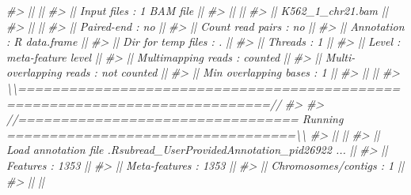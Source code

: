 \documentclass[
]{article}
\newenvironment{Shaded}{\begin{snugshade}}{\end{snugshade}}
\newcommand{\CommentTok}[1]{\textcolor[rgb]{0.56,0.35,0.01}{\textit{#1}}}
\begin{document}
\begin{Shaded}
\begin{Highlighting}[]
\CommentTok{\#\textgreater{} ||                                                                            ||}
\CommentTok{\#\textgreater{} ||             Input files : 1 BAM file                                       ||}
\CommentTok{\#\textgreater{} ||                                                                            ||}
\CommentTok{\#\textgreater{} ||                           K562\_1\_chr21.bam                                 ||}
\CommentTok{\#\textgreater{} ||                                                                            ||}
\CommentTok{\#\textgreater{} ||              Paired{-}end : no                                               ||}
\CommentTok{\#\textgreater{} ||        Count read pairs : no                                               ||}
\CommentTok{\#\textgreater{} ||              Annotation : R data.frame                                     ||}
\CommentTok{\#\textgreater{} ||      Dir for temp files : .                                                ||}
\CommentTok{\#\textgreater{} ||                 Threads : 1                                                ||}
\CommentTok{\#\textgreater{} ||                   Level : meta{-}feature level                               ||}
\CommentTok{\#\textgreater{} ||      Multimapping reads : counted                                          ||}
\CommentTok{\#\textgreater{} || Multi{-}overlapping reads : not counted                                      ||}
\CommentTok{\#\textgreater{} ||   Min overlapping bases : 1                                                ||}
\CommentTok{\#\textgreater{} ||                                                                            ||}
\CommentTok{\#\textgreater{} \textbackslash{}\textbackslash{}============================================================================//}
\CommentTok{\#\textgreater{} }
\CommentTok{\#\textgreater{} //================================= Running ==================================\textbackslash{}\textbackslash{}}
\CommentTok{\#\textgreater{} ||                                                                            ||}
\CommentTok{\#\textgreater{} || Load annotation file .Rsubread\_UserProvidedAnnotation\_pid26922 ...         ||}
\CommentTok{\#\textgreater{} ||    Features : 1353                                                         ||}
\CommentTok{\#\textgreater{} ||    Meta{-}features : 1353                                                    ||}
\CommentTok{\#\textgreater{} ||    Chromosomes/contigs : 1                                                 ||}
\CommentTok{\#\textgreater{} ||                                                                            ||}

\end{Highlighting}
\end{Shaded}
\end{document}

